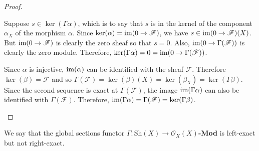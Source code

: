 \begin{proof}\hfill
  \begin{description}[style=nextline]
    \item[Exactness at $\Gamma(\mathscr{F})$]
          Suppose $s\in\ker(\Gamma\alpha)$, which is to say that $s$ is in
          the kernel of the component $\alpha_{X}$ of the morphism $\alpha$.
          Since $\ker(\alpha)=\operatorname{im}(0\to\mathscr{F})$, we have
          $s\in\operatorname{im}({0\to\mathscr{F}})(X)$. But $\operatorname{im}(0\to\mathscr{F})$ is
          clearly the zero sheaf so that $s=0$. Also,
          $\operatorname{im}(0\to\Gamma(\mathscr{F}))$ is clearly the zero module.
          Therefore, $\ker(\Gamma\alpha)=0=\operatorname{im}({0\to\Gamma(\mathscr{F})})$.
    \item[Exactness at $\Gamma(\mathscr{G})$]
          Since $\alpha$ is injective, $\operatorname{im}(\alpha)$ can be identified with
          the sheaf $\mathscr{F}$. Therefore $\ker(\beta)=\mathscr{F}$ and so
          $\Gamma\left(\mathscr{F}\right)=\ker(\beta)(X)=\ker(\beta_{X})
          =\ker(\Gamma\beta)$. Since the second sequence is exact at
          $\Gamma\left(\mathscr{F}\right)$, the image $\operatorname{im}(\Gamma\alpha)$
          can also be identified with $\Gamma\left(\mathscr{F}\right)$.
          Therefore, $\operatorname{im}(\Gamma\alpha)=\Gamma(\mathscr{F})
          =\ker(\Gamma\beta)$.
  \end{description}

\end{proof}
\begin{cat}
  We say that the global sections functor $\Gamma: \text{Sh}(X)\to
  \mathscr{O}_{X}(X)$\textbf{-Mod} is left-exact but not right-exact.
\end{cat}

